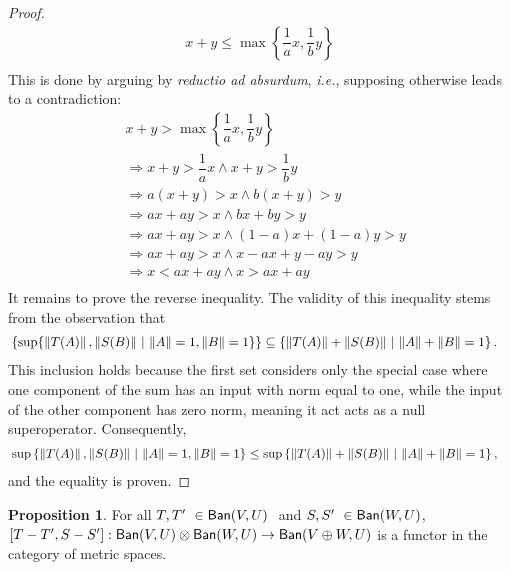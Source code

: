 \documentclass[10pt,a4paper]{amsart}
\theoremstyle{definition}
\theoremstyle{definition}
\theoremstyle{definition}
\theoremstyle{definition}
\newtheorem{proposition}[definition]{Proposition}
\theoremstyle{definition}
\theoremstyle{definition}
\begin{document}
\begin{proof}
 \begin{align*} 
     x + y  \leq  \max \left\{   \dfrac{1}{a}x  ,   \dfrac{1}{b} y   \right\} \\
 \end{align*}
 This is done by arguing by \textit{reductio ad absurdum}, \textit{i.e.}, supposing otherwise leads to a contradiction:
 \begin{align*} 
     &
      x + y  >  \max \left\{   \dfrac{1}{a}x  ,   \dfrac{1}{b} y   \right\} \\
     & \Rightarrow  x + y > \dfrac{1}{a}x  \wedge x + y > \dfrac{1}{b}y \\
     & \Rightarrow  a (x + y) > x  \wedge b (x + y)> y \\
     & \Rightarrow  a x + a y > x  \wedge b x + by > y \\
     & \Rightarrow  a x + a y > x  \wedge (1-a) x + (1-a)y > y\\
     & \Rightarrow  a x + a y > x  \wedge x-ax + y -ay > y\\
     & \Rightarrow  x < a x + a y   \wedge x > a x + a y  \\
 \end{align*}
It remains to prove the reverse inequality. The validity of this inequality stems from the observation that
\begin{align*}
  & \left\{ \sup  \{\left\lVert T (A) \right\rVert,   \left\lVert S (B) \right\rVert  \, \vert \,   \left\lVert A \right\rVert = 1, \left\lVert B \right\rVert = 1 \}\right\}   \subseteq
 \left\{  \left\lVert T (A) \right\rVert + \left\lVert S (B) \right\rVert  \, \vert \,   \left\lVert A \right\rVert + \left\lVert B \right\rVert = 1 \right\}.
\end{align*}
This inclusion holds because the first set considers only the special case where one component of the sum has an input with norm equal to one, while the input of the other component has zero norm, meaning it act acts as a null superoperator. Consequently,
\begin{align*}
  & \sup \left\{  \left\lVert T (A) \right\rVert,   \left\lVert S (B) \right\rVert  \, \vert \,   \left\lVert A \right\rVert = 1, \left\lVert B \right\rVert = 1 \right\}   \leq
 \sup \left\{  \left\lVert T (A) \right\rVert + \left\lVert S (B) \right\rVert  \, \vert \,   \left\lVert A \right\rVert + \left\lVert B \right\rVert = 1 \right\},
\end{align*}
and the equality is proven.

\end{proof}

  \begin{proposition} \label{prop:met_cond_pp}
    For all $T, T' \in \catBan(V,U)  $ and $S, S' \in \catBan(W,U) $, $[T-T',S-S']:\mathsf{Ban}(V,U) \otimes \mathsf{Ban}(W,U) \rightarrow \mathsf{Ban}(V \oplus W,U) $ is a functor in the category of metric spaces.
  \end{proposition}
\end{document}
